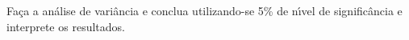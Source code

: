 \documentclass[a4paper,11pt,twoside,openright]{report}
\begin{document}
Fa\c{c}a a an\'{a}lise de vari\^{a}ncia e conclua utilizando-se 5\% de n\'{\i}vel de signific\^{a}ncia e interprete os resultados.

% 
% 
% 
\end{document}
